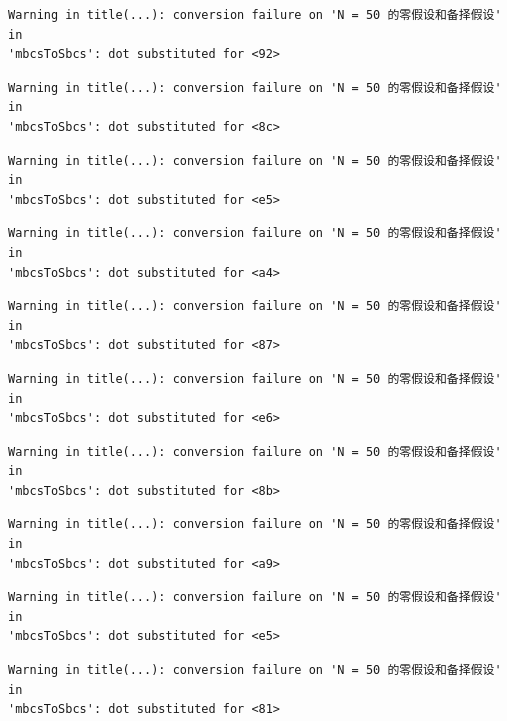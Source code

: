 \documentclass[
  letterpaper,
  DIV=11,
  numbers=noendperiod]{scrreprt}
\begin{document}
\begin{verbatim}
Warning in title(...): conversion failure on 'N = 50 的零假设和备择假设' in
'mbcsToSbcs': dot substituted for <92>
\end{verbatim}

\begin{verbatim}
Warning in title(...): conversion failure on 'N = 50 的零假设和备择假设' in
'mbcsToSbcs': dot substituted for <8c>
\end{verbatim}

\begin{verbatim}
Warning in title(...): conversion failure on 'N = 50 的零假设和备择假设' in
'mbcsToSbcs': dot substituted for <e5>
\end{verbatim}

\begin{verbatim}
Warning in title(...): conversion failure on 'N = 50 的零假设和备择假设' in
'mbcsToSbcs': dot substituted for <a4>
\end{verbatim}

\begin{verbatim}
Warning in title(...): conversion failure on 'N = 50 的零假设和备择假设' in
'mbcsToSbcs': dot substituted for <87>
\end{verbatim}

\begin{verbatim}
Warning in title(...): conversion failure on 'N = 50 的零假设和备择假设' in
'mbcsToSbcs': dot substituted for <e6>
\end{verbatim}

\begin{verbatim}
Warning in title(...): conversion failure on 'N = 50 的零假设和备择假设' in
'mbcsToSbcs': dot substituted for <8b>
\end{verbatim}

\begin{verbatim}
Warning in title(...): conversion failure on 'N = 50 的零假设和备择假设' in
'mbcsToSbcs': dot substituted for <a9>
\end{verbatim}

\begin{verbatim}
Warning in title(...): conversion failure on 'N = 50 的零假设和备择假设' in
'mbcsToSbcs': dot substituted for <e5>
\end{verbatim}

\begin{verbatim}
Warning in title(...): conversion failure on 'N = 50 的零假设和备择假设' in
'mbcsToSbcs': dot substituted for <81>
\end{verbatim}
\end{document}
